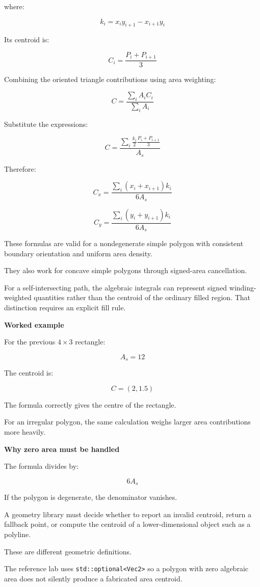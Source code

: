 where:

\[
k_i=x_iy_{i+1}-x_{i+1}y_i
\]

Its centroid is:

\[
C_i=\frac{P_i+P_{i+1}}3
\]

Combining the oriented triangle contributions using area weighting:

\[
C=\frac{\sum_i A_iC_i}{\sum_i A_i}
\]

Substitute the expressions:

\[
C= \frac{ \sum_i \frac{k_i}{2}\frac{P_i+P_{i+1}}3 }{ A_s }
\]

Therefore:

\[
\boxed{ C_x= \frac{ \sum_i(x_i+x_{i+1})k_i }{ 6A_s } }
\]

\[
\boxed{ C_y= \frac{ \sum_i(y_i+y_{i+1})k_i }{ 6A_s } }
\]

These formulas are valid for a nondegenerate simple polygon with consistent boundary orientation and uniform area density.

They also work for concave simple polygons through signed-area cancellation.

For a self-intersecting path, the algebraic integrals can represent signed winding-weighted quantities rather than the centroid of the ordinary filled region. That distinction requires an explicit fill rule.

\textbf{Worked example}

For the previous \(4\times3\) rectangle:

\[
A_s=12
\]

The centroid is:

\[
\boxed{C=(2,1.5)}
\]

The formula correctly gives the centre of the rectangle.

For an irregular polygon, the same calculation weighs larger area contributions more heavily.

\textbf{Why zero area must be handled}

The formula divides by:

\[
6A_s
\]

If the polygon is degenerate, the denominator vanishes.

A geometry library must decide whether to report an invalid centroid, return a fallback point, or compute the centroid of a lower-dimensional object such as a polyline.

These are different geometric definitions.

The reference lab uses \texttt{std::optional\textless{}Vec2\textgreater{}} so a polygon with zero algebraic area does not silently produce a fabricated area centroid.

